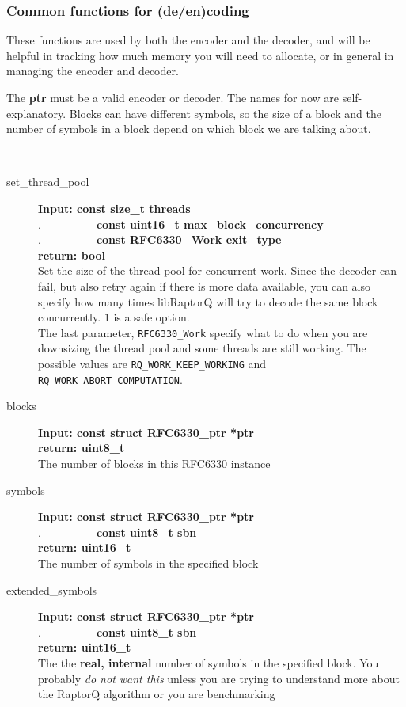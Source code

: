 \documentclass[11pt,a4paper]{refart}
\begin{document}
\newpage
\subsubsection{Common functions for (de/en)coding}

These functions are used by both the encoder and the decoder, and will be helpful in tracking how much memory
you will need to allocate, or in general in managing the encoder and decoder.

The \textbf{ptr} must be a valid encoder or decoder.
The names for now are self-explanatory. Blocks can have different symbols, so the size of a block and the number of symbols in a block
depend on which block we are talking about.

\\
\begin{description}
\item[set\_thread\_pool] \textbf{Input: const size\_t threads}\\
.\ \ \ \ \ \ \ \ \ \ \textbf{const uint16\_t max\_block\_concurrency}\\
.\ \ \ \ \ \ \ \ \ \ \textbf{const RFC6330\_Work exit\_type}\\
\textbf{return: bool}\\
Set the size of the thread pool for concurrent work. Since the decoder can fail, but also retry again if there is more data available,
you can also specify how many times libRaptorQ will try to decode the same block concurrently. $1$ is a safe option.\\
The last parameter, \texttt{RFC6330\_Work} specify what to do when you are downsizing the thread pool and some threads are still working. The possible values are \texttt{RQ\_WORK\_KEEP\_WORKING} and \texttt{RQ\_WORK\_ABORT\_COMPUTATION}.
\item[blocks] \textbf{Input: const struct RFC6330\_ptr *ptr}\\
\textbf{return: uint8\_t}\\
The number of blocks in this RFC6330 instance
\item[symbols]\textbf{Input: const struct RFC6330\_ptr *ptr}\\
.\ \ \ \ \ \ \ \ \ \ \textbf{const uint8\_t sbn}\\
\textbf{return: uint16\_t}\\
The number of symbols in the specified block
\item[extended\_symbols]\textbf{Input: const struct RFC6330\_ptr *ptr}\\
.\ \ \ \ \ \ \ \ \ \ \textbf{const uint8\_t sbn}\\
\textbf{return: uint16\_t}\\
The the \textbf{real, internal} number of symbols in the specified block. You probably \textit{do not want this} unless you are trying to understand more about the RaptorQ algorithm or you are benchmarking


\end{description}
\end{document}
